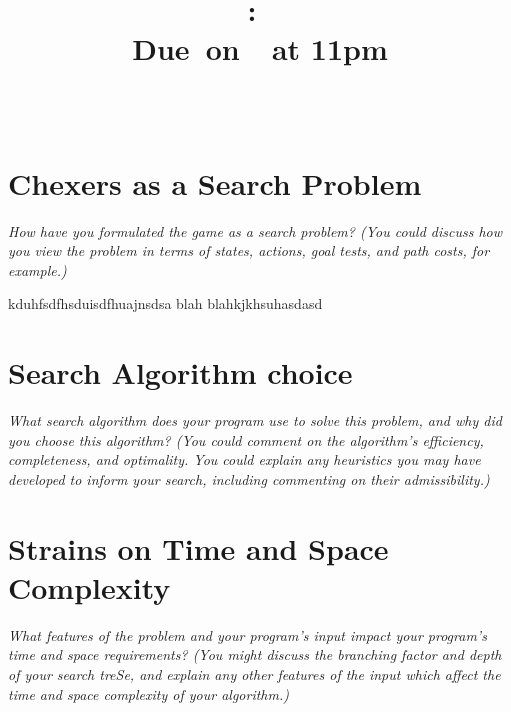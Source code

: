 \documentclass{article}[11pt]
\title{
    \vspace{2in}
    \textmd{\textbf{\hmwkClass:\ \hmwkTitle}}\\
    \normalsize\vspace{0.1in}\small{Due\ on\ \hmwkDueDate\ at 11pm}\\
    \vspace{0.1in}\large{\textit{\hmwkClassInstructor\ \hmwkClassTime}}
    \vspace{3in}
}
\author{\hmwkAuthorName}
\date{}
\theoremstyle{plain}
\theoremstyle{definition}
\begin{document}
\maketitle

\pagebreak

\section{Chexers as a Search Problem}

\textit{How have you formulated the game as a search problem? (You could discuss how you view the problem in terms of states, actions, goal tests, and path costs, for example.)}


kduhfsdfhsduisdfhuajnsdsa
blah blahkjkhsuhasdasd

\section{Search Algorithm choice}

\textit{What search algorithm does your program use to solve this problem, and why did you choose this algorithm? (You could comment on the algorithm’s efficiency, completeness, and optimality. You could explain any heuristics you may have developed to inform your search, including commenting on their admissibility.)}



\section{Strains on Time and Space Complexity}

\textit{What features of the problem and your program’s input impact your program’s time and space requirements? (You might discuss the branching factor and depth of your search treSe, and explain any other features of the input which affect the time and space complexity of your algorithm.)}
\end{document}
